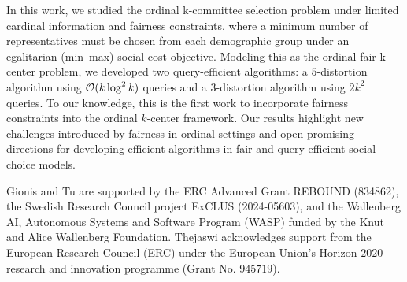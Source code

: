 
In this work, we studied the ordinal k-committee selection problem under limited cardinal information and fairness constraints, where a minimum number of representatives must be chosen from each demographic group under an egalitarian (min–max) social cost objective. Modeling this as the ordinal fair k-center problem, we developed two query-efficient algorithms: a $5$-distortion algorithm using $\mathcal{O}(k \log^2 k)$ queries and a $3$-distortion algorithm using $2k^2$ queries.
To our knowledge, this is the first work to incorporate fairness constraints into the ordinal $k$-center framework. Our results highlight new challenges introduced by fairness in ordinal settings and open promising directions for developing efficient algorithms in fair and query-efficient social choice models.

Gionis and Tu are supported by 
the ERC Advanced Grant REBOUND (834862),
the Swedish Research Council project ExCLUS (2024-05603),
and the Wallenberg AI, Autonomous Systems and Software Program (WASP) funded by the Knut and Alice Wallenberg Foundation.
Thejaswi acknowledges support from the European Research Council (ERC) under the European Union's Horizon $2020$ research and innovation programme (Grant No. $945719$). 
